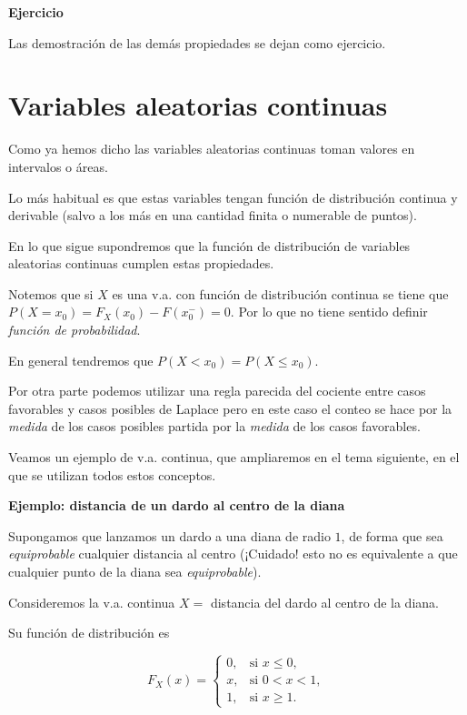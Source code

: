 \documentclass[]{book}
\begin{document}
\textbf{Ejercicio}

Las demostración de las demás propiedades se dejan como ejercicio.

\hypertarget{variables-aleatorias-continuas}{%
\section{Variables aleatorias continuas}\label{variables-aleatorias-continuas}}

Como ya hemos dicho las variables aleatorias continuas toman valores en
intervalos o áreas.

Lo más habitual es que estas variables tengan función de distribución continua y
derivable (salvo a los más en una cantidad finita o numerable de puntos).

En lo que sigue supondremos que la función de distribución de variables
aleatorias continuas cumplen estas propiedades.

Notemos que si \(X\) es una v.a. con función de distribución continua se tiene que
\(P(X=x_0)=F_X(x_0)-F(x_0^{-})=0\). Por lo que no tiene sentido definir \emph{función de probabilidad}.

En general tendremos que \(P(X<x_0)=P(X\leq x_0)\).

Por otra parte podemos utilizar una regla parecida del
cociente entre casos favorables y casos posibles de Laplace pero en
este caso el conteo se hace por la \emph{medida} de los casos
posibles partida por la \emph{medida} de los casos favorables.

Veamos un ejemplo de v.a. continua, que ampliaremos en el tema siguiente, en el que se utilizan todos estos conceptos.

\textbf{Ejemplo: distancia de un dardo al centro de la diana}

Supongamos que lanzamos un dardo a una diana de radio \(1\), de forma que sea \emph{equiprobable} cualquier distancia al centro (¡Cuidado! esto no es equivalente
a que cualquier punto de la diana sea \emph{equiprobable}).

Consideremos la v.a. continua \(X=\) distancia del dardo al centro de la diana.

Su función de distribución es

\[
F_{X}(x)=
\left\{
\begin{array}{ll}
0, & \mbox{si } x\leq 0,\\
x, & \mbox{si } 0<x<1,\\
1, & \mbox{si } x\geq 1.
\end{array}
\right.
\]
\end{document}
